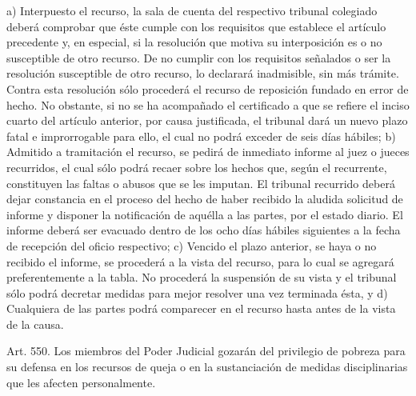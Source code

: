     a) Interpuesto el recurso, la sala de cuenta del respectivo tribunal colegiado deberá comprobar que éste cumple con los requisitos que establece el artículo precedente y, en especial, si la resolución que motiva su interposición es o no susceptible de otro recurso. De no cumplir con los requisitos señalados o ser la resolución susceptible de otro recurso, lo declarará inadmisible, sin más trámite. Contra esta resolución sólo procederá el recurso de reposición fundado en error de hecho. No obstante, si no se ha acompañado el certificado a que se refiere el inciso cuarto del artículo anterior, por causa justificada, el tribunal dará un nuevo plazo fatal e improrrogable para ello, el cual no podrá exceder de seis días hábiles;
    b) Admitido a tramitación el recurso, se pedirá de inmediato informe al juez o jueces recurridos, el cual sólo podrá recaer sobre los hechos que, según el recurrente, constituyen las faltas o abusos que se les imputan. El tribunal recurrido deberá dejar constancia en el proceso del hecho de haber recibido la aludida solicitud de informe y disponer la notificación de aquélla a las partes, por el estado diario. El informe deberá ser evacuado dentro de los ocho días hábiles siguientes a la fecha de recepción del oficio respectivo;
    c) Vencido el plazo anterior, se haya o no recibido el informe, se procederá a la vista del recurso, para lo cual se agregará preferentemente a la tabla. No procederá la suspensión de su vista y el tribunal sólo podrá decretar medidas para mejor resolver una vez terminada ésta, y
    d) Cualquiera de las partes podrá comparecer en el recurso hasta antes de la vista de la causa.


    Art. 550. Los miembros del Poder Judicial gozarán del privilegio de pobreza para su defensa en los recursos de queja o en la sustanciación de medidas disciplinarias que les afecten personalmente.

